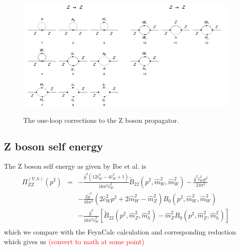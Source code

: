 \documentclass[11pt]{article}
\begin{document}
\begin{figure}[h!]
\center
\includegraphics[width=0.5\textwidth]{diagrams_V[2]_1_1.pdf}\includegraphics[width=0.5\textwidth]{diagrams_V[2]_1_2.pdf}
\caption{The one-loop corrections to the Z boson propagator.}\label{fig:gammagamma}
\end{figure}

\subsection{Z boson self energy}

The Z boson self energy as given by Ibe et al. is
{
\begin{eqnarray}
\Pi_{ZZ}^{(V,h)}(p^2) &=& 
-\frac{ \hat{g}^2 (12\hat{c}_W^4 - 4\hat{c}_W^2 + 1) }{16\pi^2 \hat{c}_W^2}
\tilde B_{22}(p^2, \hat{m}_W^2, \hat{m}_W^2) 
-\frac{ \hat{g}^2 \hat{c}_W^2 p^2 }{24\pi^2} \nonumber \\
&& -\frac{2\hat{g}^2}{16\pi^2}(2\hat{c}_W^2 p^2 + 2\hat{m}_W^2 - \hat{m}_Z^2)
B_0(p^2, \hat{m}_W^2, \hat{m}_W^2) \nonumber \\
&& -\frac{ \hat{g}^2 }{16\pi^2 \hat{c}_W^2}
[\tilde B_{22}(p^2, \hat{m}_Z^2, \hat{m}_h^2)
-\hat{m}_Z^2 B_0(p^2, \hat{m}_Z^2, \hat{m}_h^2) ]\\
\end{eqnarray}
}
which we compare with the FeynCalc calculation and corresponding reduction which gives us \textcolor{red}{(convert to math at some point)}
\end{document}
